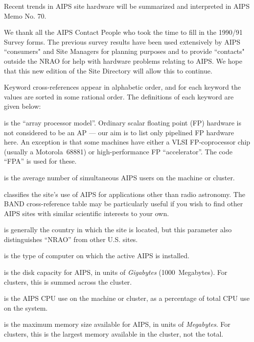 Recent trends in AIPS site hardware will be summarized and interpreted
in AIPS Memo No.  70.

We thank all the AIPS Contact People who took the time to fill in the
1990/91 Survey forms.  The previous survey results have been used
extensively by AIPS ``consumers" and Site Managers for planning purposes and
to provide ``contacts" outside the NRAO for help with hardware problems
relating to AIPS.  We hope that this new edition of the Site Directory
will allow this to continue.

\vfill\eject {}

\par\noindent
Keyword cross-references appear in alphabetic order, and for each
keyword the values are sorted in some rational order.  The definitions
of each keyword are given below:

 is the ``array processor model''.  Ordinary scalar
floating point (FP) hardware is not considered to be an AP --- our aim
is to list only pipelined FP hardware here.  An exception is that some
machines have either a VLSI FP-coprocessor chip (usually a
Motorola~68881) or high-performance FP ``accelerator''.  The code
``FPA'' is used for these.

 is the average number of simultaneous AIPS
users on the machine or cluster.

 classifies the site's use of AIPS for applications
other than radio astronomy.  The BAND cross-reference table may be
particularly useful if you wish to find other AIPS sites with similar
scientific interests to your own.

 is generally the country in which the site is
located, but this parameter also distinguishes ``NRAO'' from other U.S.
sites.

 is the type of computer on which the active AIPS is
installed.

 is the disk capacity for AIPS, in units of
{\it Gigabytes} (1000~Megabytes).  For clusters, this is summed across
the cluster.

 is the AIPS CPU use on the machine or cluster, as
a percentage of total CPU use on the system.

 is the maximum memory size available for AIPS, in
units of {\it Megabytes}.  For clusters, this is the largest memory
available in the cluster, not the total.

